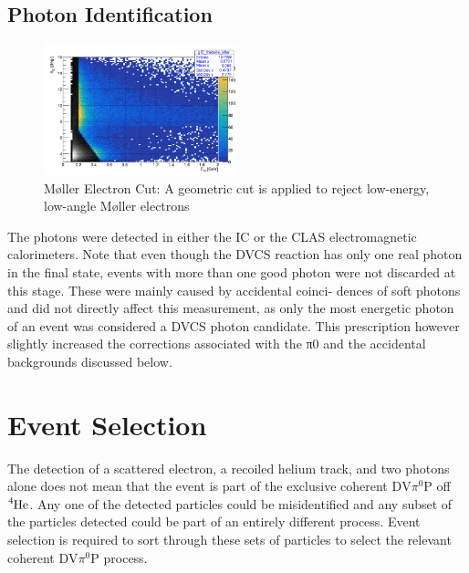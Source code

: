 \documentclass[10pt,prd,aps,showpacs,twocolumn,unsortedaddress]{revtex4-1}
\newcommand\he{{\ce{^{4}He}}}
\newcommand\pio{{\pi^0}}
\newcommand\dvmp{{\text{DV}\pio\text{P}}}
\newcommand\moller{{M{\o}ller} }
\begin{document}
\subsection{Photon Identification}
        \begin{figure}[h!]
          \centering
          \includegraphics[width=0.5\textwidth]{figs/pid/g/IC/thetaVe}
          \caption[...]{\moller Electron Cut: A geometric cut is applied to reject low-energy, low-angle \moller electrons} 
          \label{fig:pid:gic:moller}
        \end{figure}
The photons were detected in either the IC or the CLAS electromagnetic calorimeters. Note that even though the DVCS reaction has only one real photon in the final state, events with more than one good photon were not discarded at this stage. These were mainly caused by accidental coinci- dences of soft photons and did not directly affect this measurement, as only the most energetic photon of an event was considered a DVCS photon candidate. This prescription however slightly increased the corrections associated with the π0 and the accidental backgrounds discussed below.

\section{Event Selection \label{kinfit}}
The detection of a scattered electron, a recoiled helium track, and two photons alone does not mean that the event is part of the exclusive coherent $\dvmp$ off $\he$. Any one of the detected particles could be misidentified and any subset of the particles detected could be part of an entirely different process. Event selection is required to sort through these sets of particles to select the relevant coherent $\dvmp$ process.
\end{document}
